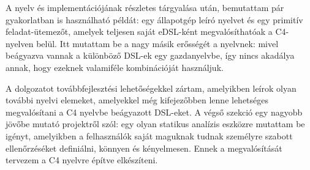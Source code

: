 A nyelv és implementációjának részletes tárgyalása után, bemutattam pár gyakorlatban is használható példát: egy állapotgép leíró nyelvet és egy primitív feladat-ütemezőt, amelyek teljesen saját \gls{eDSL}-ként megvalósíthatóak a C4-nyelven belül.
Itt mutattam be a nagy másik erősségét a nyelvnek: mivel beágyazva vannak a különböző \gls{DSL}-ek egy gazdanyelvbe, így nincs akadálya annak, hogy ezeknek valamiféle kombinációját használjuk.

A dolgozatot továbbfejlesztési lehetőségekkel zártam, amelyikben leírok olyan további nyelvi elemeket, amelyekkel még kifejezőbben lenne lehetséges megvalósítani a C4 nyelvbe beágyazott \gls{DSL}-eket.
A végső szekció egy nagyobb jövőbe mutató projektről szól: egy olyan statikus analízis eszközre mutattam be igényt, amelyikben a felhasználók saját maguknak tudnak személyre szabott ellenőrzéséket definiálni, könnyen és kényelmesen.
Ennek a megvalósítását tervezem a C4 nyelvre építve elkészíteni.









